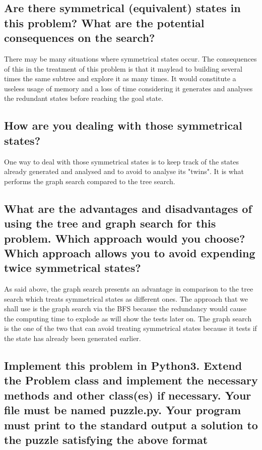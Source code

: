 \documentclass[a4paper,10pt]{article}
\begin{document}
	\subsection{Are there symmetrical (equivalent) states in this problem? What are the potential consequences on the search?}
	
	There may be many situations where symmetrical states occur. The consequences of this in the treatment of this problem is that it maylead to building several times the same subtree and explore it as many times. It would constitute a useless usage of memory and a loss of time considering it generates and analyses the redundant states before reaching the goal state.
	
	\subsection{How are you dealing with those symmetrical states?}
	
	One way to deal with those symmetrical states is to keep track of the states already generated and analysed and to avoid to analyse its "twins". It is what performs the graph search compared to the tree search.
	
	\subsection{What are the advantages and disadvantages of using the tree and graph search for this problem. Which approach would you choose? Which approach allows you to avoid expending twice symmetrical states?}

	As said above, the graph search presents an advantage in comparison to the tree search which treats symmetrical states as different ones. The approach that we shall use is the graph search via the BFS because the redundancy would cause the computing time to explode as will show the tests later on.
	The graph search is the one of the two that can avoid treating symmetrical states because it tests if the state has already been generated earlier.
	
	\subsection{Implement this problem in Python3. Extend the Problem class and implement the necessary methods and other class(es) if necessary. Your file must be named puzzle.py. Your program must print to the standard output a solution to the puzzle satisfying the above format}
	
\end{document}
